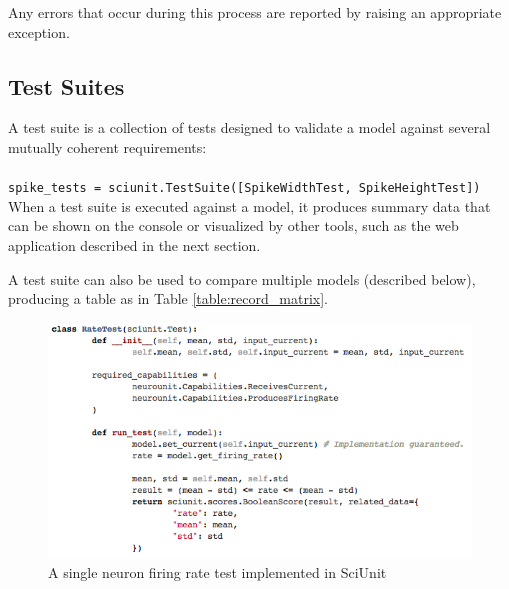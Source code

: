 \documentclass[11pt,letterpaper]{article}
\begin{document}
Any errors that occur during this process are reported by raising an appropriate exception.

\subsection{Test Suites}
A test suite is a collection of tests designed to validate a model against several mutually coherent requirements:
\\
\\
\verb|spike_tests = sciunit.TestSuite([SpikeWidthTest, SpikeHeightTest])|
\\

When a test suite is executed against a model, it produces summary data that can be shown on the console or visualized by other tools, such as the web application described in the next section.

A test suite can also be used to compare multiple models (described below), producing a table as in Table \ref{table:record_matrix}.

\begin{figure}
\includegraphics[scale=0.6]{rate_test.png}
\caption{A single neuron firing rate test implemented in SciUnit}
\label{fig:rate_test}
\end{figure}
\end{document}
